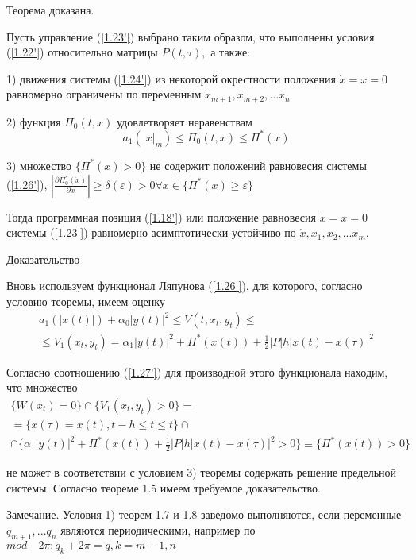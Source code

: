 Теорема доказана.

\begin{theorem}\label{t-1.11}
Пусть управление (\ref{1.23'}) выбрано таким образом, что выполнены условия (\ref{1.22'}) относительно матрицы $P(t, \tau),$ а также: 

1) движения системы (\ref{1.24'}) из некоторой окрестности положения $\dot x = x = 0$ равномерно ограничены по переменным $x_{m+1}, x_{m+2},... x_n$

2) функция $\Pi_0 (t, x)$ удовлетворяет неравенствам $$a_1 (\left| x \right|_m) \le \Pi_0 (t, x) \le \Pi^{*} (x)$$

3) множество $\lbrace \Pi^{*} (x) > 0 \rbrace$ не содержит положений равновесия системы (\ref{1.26'}), $\left| \frac{\partial \Pi_0^{*} (\dot x)}{\partial x} \right| \ge \delta(\varepsilon) > 0 \forall x \in \lbrace \Pi^{*} (x) \ge \varepsilon \rbrace$

Тогда программная позиция (\ref{1.18'}) или положение равновесия $\dot x = x = 0$ системы (\ref{1.23'}) равномерно асимптотически устойчиво по $\dot x, x_1, x_2, ... x_m.$
\end{theorem}

Доказательство

Вновь используем функционал Ляпунова (\ref{1.26'}), для которого, согласно условию теоремы, имеем оценку 
$$
\begin{array}{c}
a_1 (\left| x(t) \right|) + \alpha_0 \left| y(t) \right|^2 \le V(t, x_t, y_t) \le\\
\le V_1 (x_t, y_t) = \alpha_1 \left| y(t) \right|^2 + \Pi^{*} (x(t)) + \frac12 \left| P \right| h \left| x(t) - x(\tau) \right|^2
\end{array}
$$

Согласно соотношению (\ref{1.27'}) для производной этого функционала находим, что множество
$$
\begin{array}{c}
\lbrace W (x_t) = 0 \rbrace \cap \lbrace V_1(x_t, y_t) > 0 \rbrace =\\
= \lbrace x(\tau) = x(t), t-h \le t \le t \rbrace \cap\\
\cap \{ \alpha_1 \left| y(t) \right|^2 + \Pi^{*} (x(t)) + \frac12 \left| P\right| h \left| x(t) - x(\tau) \right|^2 > 0 \rbrace \equiv \lbrace \Pi^{*} (x(t)) > 0 \}
\end{array}
$$

не может в соответствии с условием 3) теоремы содержать решение предельной системы. Согласно теореме 1.5 имеем требуемое доказательство.

Замечание. Условия 1) теорем 1.7 и 1.8 заведомо выполняются, если переменные $q_{m+1}, ... q_n$ являются периодическими, например по $mod \quad 2 \pi: q_k + 2 \pi = q, k = m + 1, n$